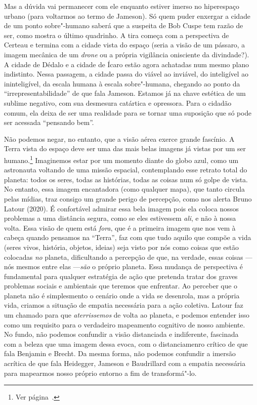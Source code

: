 Mas a dúvida vai permanecer com ele enquanto estiver imerso no
hiperespaço urbano (para voltarmos ao termo de Jameson). Só quem
puder enxergar a cidade de um ponto sobre"-humano saberá que a suspeita
de Bob Cuspe tem razão de ser, como mostra o último quadrinho. A tira
começa com a perspectiva de Certeau e termina com a cidade vista do
espaço (seria a visão de um pássaro, a imagem mecânica de um
\emph{drone} ou a própria vigilância onisciente da divindade?). A cidade
de Dédalo e a cidade de Ícaro estão agora achatadas num mesmo plano
indistinto. Nessa passagem, a cidade passa do viável ao inviável, do
inteligível ao ininteligível, da escala humana à escala sobre"-humana,
chegando ao ponto da ``irrepresentabilidade'' de que fala Jameson.
Estamos já na chave estética de um sublime negativo, com sua desmesura
catártica e opressora. Para o cidadão comum, ela deixa de ser uma
realidade para se tornar uma suposição que só pode ser acessada
``pensando bem''.

Não podemos negar, no entanto, que a visão aérea exerce grande fascínio.
A Terra vista do espaço deve ser uma das mais belas imagens já vistas por um ser humano.\footnote{Ver página~\pageref{marble}.} Imaginemos estar por um momento diante do globo azul, como um astronauta voltando de uma missão espacial, contemplando esse retrato total do planeta: todos os seres, todas as histórias, todas as coisas num só golpe de vista. No entanto, essa imagem encantadora (como qualquer mapa), que tanto circula pelas mídias, traz consigo um grande perigo de percepção, como nos alerta Bruno Latour (2020). É confortável admirar essa bela imagem pois ela coloca nossos problemas a uma distância segura, como se eles estivessem \emph{ali}, e não à nossa volta. Essa visão de quem está \emph{fora}, que é a primeira imagem que nos vem à cabeça quando pensamos na ``Terra'', faz com que tudo aquilo que compõe a vida (seres vivos, história, objetos, ideias) seja visto por nós como coisas que estão colocadas \emph{no} planeta, dificultando a percepção de que, na verdade, essas coisas --- nós mesmos entre elas ---\emph{são} o próprio planeta. Essa mudança de perspectiva é fundamental para qualquer estratégia de ação que pretenda tratar dos graves problemas sociais e ambientais que teremos que enfrentar. Ao perceber que o planeta não é simplesmento o cenário onde a vida se desenrola, mas a própria vida, criamos a situação de empatia necessária para a ação coletiva. Latour faz um chamado para que \emph{aterrissemos} de volta ao planeta, e podemos entender isso como um requisito para o verdadeiro mapeamento cognitivo de nosso ambiente. No fundo, não podemos confundir a visão distanciada e indiferente, fascinada com a beleza que uma imagem dessa evoca, com o distanciamenro crítico de que fala Benjamin e Brecht. Da mesma forma, não podemos confundir a imersão acrítica de que fala Heidegger, Jameson e Baudrillard com a empatia necessária para mapearmos nosso próprio entorno a fim de transformá"-lo.


